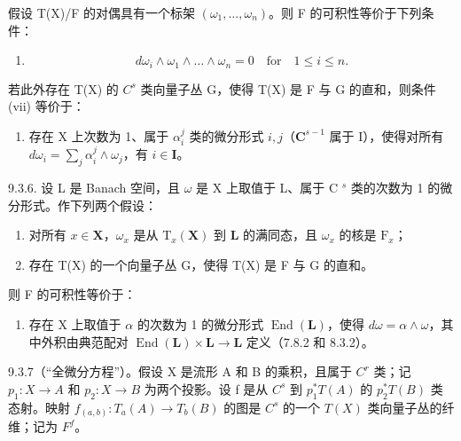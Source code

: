 假设 T(X)/F 的对偶具有一个标架 \((\omega_{1},\ldots,\omega_{n})\)。则 F 的可积性等价于下列条件：

\begin{enumerate}
\def\labelenumi{(\roman{enumi})}
\setcounter{enumi}{6}
\tightlist
\item
  \[
  d \omega_ {i} \wedge \omega_ {1} \wedge \dots \wedge \omega_ {n} = 0 \quad \text {for} \quad 1 \leqslant i \leqslant n.
  \]
\end{enumerate}

若此外存在 T(X) 的 \(C^{s}\) 类向量子丛 G，使得 T(X) 是 F 与 G 的直和，则条件 (vii) 等价于：

\begin{enumerate}
\def\labelenumi{(\roman{enumi})}
\setcounter{enumi}{7}
\tightlist
\item
  存在 X 上次数为 1、属于 \(\alpha_{i}^{j}\) 类的微分形式 \(i, j\)（\(\mathbf{C}^{s-1}\) 属于 I），使得对所有 \(d\omega_{i} = \sum_{j} \alpha_{i}^{j} \wedge \omega_{j}\)，有 \(i \in \mathbf{I}\)。
\end{enumerate}

9.3.6. 设 L 是 Banach 空间，且 \(\omega\) 是 X 上取值于 L、属于 C \(^{s}\) 类的次数为 1 的微分形式。作下列两个假设：

\begin{enumerate}
\def\labelenumi{\alph{enumi})}
\item
  对所有 \(x \in \mathbf{X}\)，\(\omega_x\) 是从 \(\mathrm{T}_x(\mathbf{X})\) 到 \(\mathbf{L}\) 的满同态，且 \(\omega_x\) 的核是 \(\mathrm{F}_x\)；
\item
  存在 T(X) 的一个向量子丛 G，使得 T(X) 是 F 与 G 的直和。
\end{enumerate}

则 F 的可积性等价于：

\begin{enumerate}
\def\labelenumi{(\roman{enumi})}
\setcounter{enumi}{8}
\tightlist
\item
  存在 X 上取值于 \(\alpha\) 的次数为 1 的微分形式 \(\operatorname{End}(\mathbf{L})\)，使得 \(d\omega = \alpha \wedge \omega\)，其中外积由典范配对 \(\operatorname{End}(\mathbf{L}) \times \mathbf{L} \to \mathbf{L}\) 定义（7.8.2 和 8.3.2）。
\end{enumerate}

9.3.7（“全微分方程”）。假设 X 是流形 A 和 B 的乘积，且属于 \(C^{r}\) 类；记 \(p_{1}: X \to A\) 和 \(p_{2}: X \to B\) 为两个投影。设 f 是从 \(C^{s}\) 到 \(p_{1}^{*}T(A)\) 的 \(p_{2}^{*}T(B)\) 类态射。映射 \(f_{(a,b)}: T_{a}(A) \to T_{b}(B)\) 的图是 \(C^{s}\) 的一个 \(T(X)\) 类向量子丛的纤维；记为 \(F^{f}\)。

